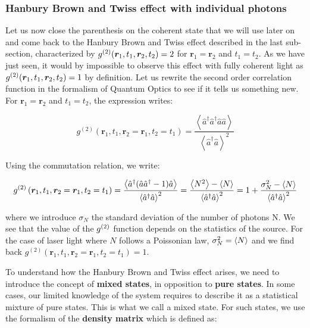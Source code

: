 \subsubsection{Hanbury Brown and Twiss effect with individual photons}

Let us now close the parenthesis on the coherent state that we will use later on and come back to the Hanbury Brown and Twiss effect described in the last sub-section, characterized by $g^{(2)} (\bm{r}_1, t_1, \bm{r}_2, t_2) = 2$ for $\bm{r}_1 = \bm{r}_2$ and $t_1=t_2$. As we have just seen, it would by impossible to observe this effect with fully coherent light as $g^{(2)} (\bm{r}_1, t_1, \bm{r}_2, t_2) = 1$ by definition. Let us rewrite the second order correlation function in the formalism of Quantum Optics to see if it tells us something new. For $\bm{r}_1 = \bm{r}_2$ and $t_1=t_2$, the expression writes: 

\begin{equation}
     g^{(2)}\left(\bm{r}_{1}, t_{1}, \bm{r}_{2}=\bm{r}_1, t_{2}=t_1\right) = \frac{\left\langle\hat{a}^{\dagger} \hat{a}^{\dagger} \hat{a} \hat{a}\right\rangle} {\left\langle\hat{a}^{\dagger} \hat{a}\right\rangle^{2}}
\end{equation}

\noindent Using the commutation relation, we write:

\begin{equation}
    g^{(2)}\left(\bm{r}_{1}, t_{1}, \bm{r}_{2}=\bm{r}_1, t_{2}=t_1\right) = \frac{\left\langle\hat{a}^{\dagger} ( \hat{a} \hat{a}^{\dagger}-1) \hat{a} \right\rangle} {\left\langle\hat{a}^{\dagger} \hat{a}\right\rangle^{2}} = \frac{\left\langle N^2\right\rangle-\left\langle N\right\rangle}{\left\langle\hat{a}^{\dagger} \hat{a}\right\rangle^{2}}  = 1 +  \frac{\sigma^2_N-\left\langle N\right\rangle}{\left\langle\hat{a}^{\dagger} \hat{a}\right\rangle^{2}}
    \label{eq:g2_variance}
\end{equation}

\noindent where we introduce $\sigma_N$ the standard deviation of the number of photons N. We see that the value of the $g^{(2)}$ function depends on the statistics of the source. For the case of laser light where $N$ follows a Poissonian law, $\sigma_N^2 = \left\langle N\right\rangle$ and we find back $g^{(2)}\left(\bm{r}_{1}, t_{1}, \bm{r}_{2}=\bm{r}_1, t_{2}=t_1\right) = 1$.

To understand how the Hanbury Brown and Twiss effect arises, we need to introduce the concept of \textbf{mixed states}, in opposition to \textbf{pure states}. In some cases, our limited knowledge of the system requires to describe it as a statistical mixture of pure states. This is what we call a mixed state. For such states, we use the formalism of the \textbf{density matrix} which is defined as:

